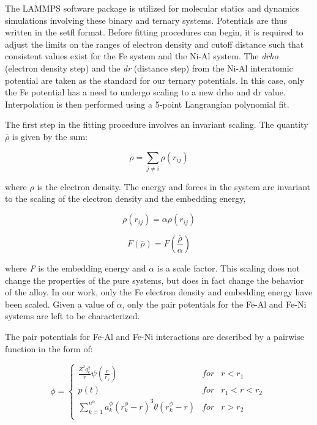 \documentclass[review]{elsarticle}
\begin{document}
The LAMMPS \cite{plimpton1995} software package is utilized for molecular statics and dynamics simulations involving these binary and ternary systems.  Potentials are thus written in the setfl format.  Before fitting procedures can begin, it is required to adjust the limits on the ranges of electron density and cutoff distance such that consistent values exist for the Fe system and the Ni-Al system.  The \textit{drho} (electron density step) and the \textit{dr} (distance step) from the Ni-Al interatomic potential are taken as the standard for our ternary potentials.  In this case, only the Fe potential has a need to undergo scaling to a new drho and dr value.  Interpolation is then performed using a 5-point Langrangian polynomial fit.  

The first step in the fitting procedure involves an invariant scaling.  The quantity $\bar{\rho}$  is given by the sum:

\begin{equation}
\bar{\rho} = \sum_{j \neq i} \rho(r_{ij})
\end{equation}

where $\rho$ is the electron density.  The energy and forces in the system are invariant to the scaling of the electron density and the embedding energy,

\begin{equation}
\rho(r_{ij}) = \alpha\rho(r_{ij})
\end{equation}

\begin{equation}
F(\bar{\rho}) = F(\frac{\bar{\rho}}{\alpha}) 
\end{equation}

where \textit{F} is the embedding energy and $\alpha$ is a scale factor.  This scaling does not change the properties of the pure systems, but does in fact change the behavior of the alloy.  In our work, only the Fe electron density and embedding energy have been scaled.  Given a value of $\alpha$, only the pair potentials for the Fe-Al and Fe-Ni systems are left to be characterized.  

The pair potentials for Fe-Al and Fe-Ni interactions are described by a pairwise function in the form of:

\begin{equation}
\phi = \left\{ \begin{array}{lcr}
		\frac{Z^{2}q_{e}^{2}}{r}\psi(\frac{r}{r_{s}}) & for & r < r_{1} \\
		p(t) & for & r_{1} < r < r_{2} \\
		\sum\limits_{k=1}^{n^{\phi}} a_{k}^{\phi}(r_{k}^{\phi}-r)^{3}\theta(r_{k}^{\phi}-r) & for & r > r_{2} \\
		\end{array} \right.\ 
\end{equation}
\end{document}
